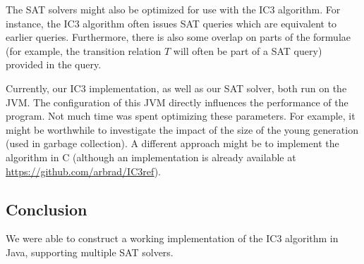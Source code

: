 \documentclass[a4paper]{article}
\begin{document}
The SAT solvers might also be optimized for use with the IC3 algorithm. For instance, the IC3 algorithm often issues SAT queries which are equivalent to earlier queries. Furthermore, there is also some overlap on parts of the formulae (for example, the transition relation $T$ will often be part of a SAT query) provided in the query.

Currently, our IC3 implementation, as well as our SAT solver, both run on the JVM. The configuration of this JVM directly influences the performance of the program. Not much time was spent optimizing these parameters. For example, it might be worthwhile to investigate the impact of the size of the young generation (used in garbage collection). A different approach might be to implement the algorithm in C (although an implementation is already available at \url{https://github.com/arbrad/IC3ref}).


\subsection{Conclusion}
We were able to construct a working implementation of the IC3 algorithm in Java, supporting multiple SAT solvers.



\end{document}
